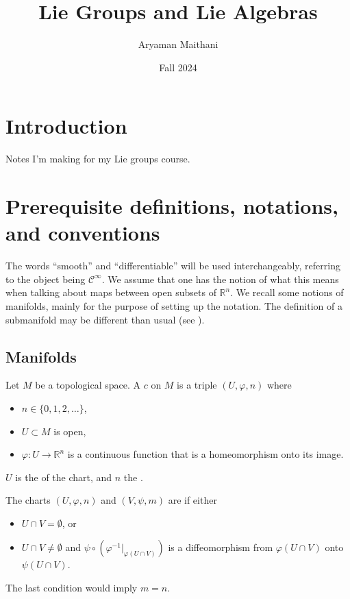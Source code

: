 \documentclass[12pt]{article}
\title{Lie Groups and Lie Algebras}
\author{Aryaman Maithani}
\date{Fall 2024}
\begin{document}
\maketitle
\tableofcontents

\section*{Introduction}

Notes I'm making for my Lie groups course. 

\section{Prerequisite definitions, notations, and conventions}

The words ``smooth'' and ``differentiable'' will be used interchangeably, referring to the object being $\mathcal{C}^{\infty}$. 
We assume that one has the notion of what this means when talking about maps between open subsets of $\mathbb{R}^{n}$. 
We recall some notions of manifolds, mainly for the purpose of setting up the notation. \newline
The definition of a submanifold may be different than usual (see ).

\subsection{Manifolds}

Let $M$ be a topological space. A  $c$ on $M$ is a triple $(U, \varphi, n)$ where
\begin{itemize}
	\item $n \in \{0, 1, 2, \ldots\}$,
	\item $U \subset M$ is open,
	\item $\varphi \colon U \to \mathbb{R}^{n}$ is a continuous function that is a homeomorphism onto its image.
\end{itemize}
$U$ is the  of the chart, and $n$ the . 

The charts $(U, \varphi, n)$ and $(V, \psi, m)$ are  if either
\begin{itemize}
	\item $U \cap V = \emptyset$, or
	\item $U \cap V \neq \emptyset$ and $\psi \circ \left(\varphi^{-1}|_{\varphi(U \cap V)}\right)$ is a diffeomorphism from $\varphi(U \cap V)$ onto $\psi(U \cap V)$.
\end{itemize}
The last condition would imply $m = n$. 
\end{document}
